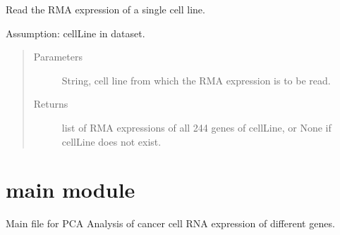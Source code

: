 \documentclass[letterpaper,10pt,english]{sphinxmanual}
\begin{document}
\begin{fulllineitems}

\begin{fulllineitems}
\label{\detokenize{CellLineRMAExpression:CellLineRMAExpression.CellLineRMAExpression.readRMAExpression}}
\sphinxAtStartPar
Read the RMA expression of a single cell line.

\sphinxAtStartPar
Assumption: cellLine in dataset.
\begin{quote}\begin{description}
\item[{Parameters}] \leavevmode
\sphinxAtStartPar
{} \textendash{} String, cell line from which the RMA expression is to be read.

\item[{Returns}] \leavevmode
\sphinxAtStartPar
list of RMA expressions of all 244 genes of cellLine, or None if cellLine does not exist.

\end{description}\end{quote}

\begin{sphinxVerbatim}[commandchars=\\\{\}]
\end{sphinxVerbatim}

\end{fulllineitems}


\end{fulllineitems}



\section{main module}
\label{\detokenize{main:module-main}}\label{\detokenize{main:main-module}}\label{\detokenize{main::doc}}
\sphinxAtStartPar
Main file for PCA Analysis of cancer cell RNA expression of different genes.
\end{document}
